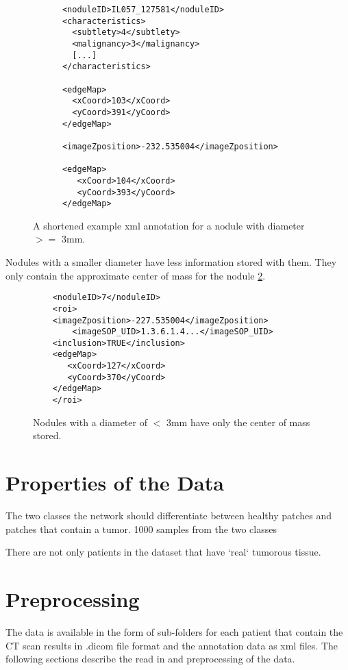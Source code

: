 \documentclass[../Thesis.tex]{subfiles}
\begin{document}
\begin{figure}
\begin{lstlisting}
      <noduleID>IL057_127581</noduleID>
      <characteristics>
        <subtlety>4</subtlety>
        <malignancy>3</malignancy>
        [...]
      </characteristics>
      
      <edgeMap>
        <xCoord>103</xCoord>
        <yCoord>391</yCoord>
      </edgeMap>
 
      <imageZposition>-232.535004</imageZposition>
       
      <edgeMap>
         <xCoord>104</xCoord>
         <yCoord>393</yCoord>
      </edgeMap>
\end{lstlisting}
\caption{A shortened example xml annotation for a nodule with diameter $>=$ 3mm.}
\label{fig:bigNod}
\end{figure}

Nodules with a smaller diameter have less information stored with them. They only contain the approximate center of mass for the nodule \ref{fig:smallNod}.

\begin{figure}
\begin{lstlisting}
	<noduleID>7</noduleID>
	<roi>
	<imageZposition>-227.535004</imageZposition>
        <imageSOP_UID>1.3.6.1.4...</imageSOP_UID>
	<inclusion>TRUE</inclusion>
	<edgeMap>
	   <xCoord>127</xCoord>
	   <yCoord>370</yCoord>
	</edgeMap>
	</roi>
\end{lstlisting}
\caption{Nodules with a diameter of $<$ 3mm have only the center of mass stored.}
\label{fig:smallNod}
\end{figure}

\section{Properties of the Data}

The two classes the network should differentiate between healthy patches and patches that contain a tumor. 1000 samples from the two classes 

There are not only patients in the dataset that have `real` tumorous tissue. 



\section{Preprocessing}
The data is available in the form of sub-folders for each patient that contain the CT scan results in .dicom file format and the annotation data as xml files. The following sections describe the read in and preprocessing of the data.
\end{document}
